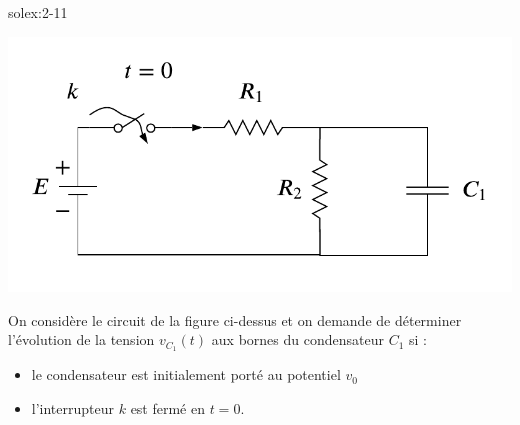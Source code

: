 \begin{exwithsol}{}{solex:2-11}
	\label{ex:2-11}
	\begin{center}
		\includegraphics[width=0.6\linewidth]{exercices/ex-3-11}
	\end{center}
	On consid\`ere le circuit de la figure ci-dessus et on demande de
	d\'eterminer l'\'evolution de la tension $v_{C_1}(t)$ aux bornes du
	condensateur $C_1$ si :
	\begin{itemize}
		\item le condensateur est initialement port\'e au potentiel $v_0$
		\item l'interrupteur $k$ est ferm\'e en $t=0$.
	\end{itemize}
	
\end{exwithsol}

